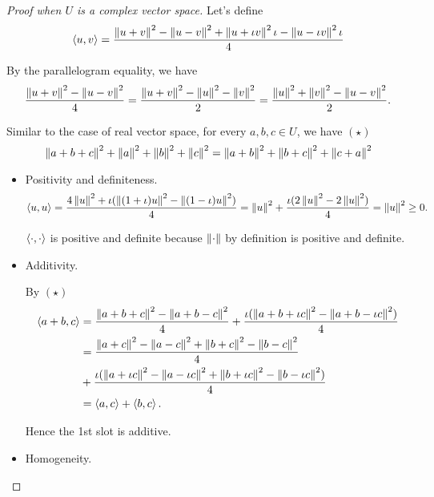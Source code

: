 \begin{proof}[Proof when $U$ is a complex vector space]
    Let's define
    \[
        \left\langle{u, v}\right\rangle = \frac{\left\Vert{u + v}\right\Vert^{2} - \left\Vert{u - v}\right\Vert^{2} + \left\Vert{u + \iota v}\right\Vert^{2}\iota - \left\Vert{u - \iota v}\right\Vert^{2}\iota}{4}
    \]

    By the parallelogram equality, we have
    \[
        \frac{\left\Vert{u + v}\right\Vert^{2} - \left\Vert{u - v}\right\Vert^{2}}{4} = \frac{\left\Vert{u + v}\right\Vert^{2} - \left\Vert{u}\right\Vert^{2} - \left\Vert{v}\right\Vert^{2}}{2} = \frac{\left\Vert{u}\right\Vert^{2} + \left\Vert{v}\right\Vert^{2} - \left\Vert{u - v}\right\Vert^{2}}{2}.
    \]

    Similar to the case of real vector space, for every $a, b, c\in U$, we have $(\star)$
    \[
        \left\Vert{a + b + c}\right\Vert^{2} + \left\Vert{a}\right\Vert^{2} + \left\Vert{b}\right\Vert^{2} + \left\Vert{c}\right\Vert^{2} = \left\Vert{a + b}\right\Vert^{2} + \left\Vert{b + c}\right\Vert^{2} + \left\Vert{c + a}\right\Vert^{2}
    \]

    \begin{itemize}
        \item Positivity and definiteness.
              \[
                  \left\langle{u, u}\right\rangle = \frac{4\left\Vert{u}\right\Vert^{2} + \iota(\left\Vert{(1 + \iota)u}\right\Vert^{2} - \left\Vert{(1 - \iota)u}\right\Vert^{2})}{4} = \left\Vert{u}\right\Vert^{2} + \frac{\iota(2\left\Vert{u}\right\Vert^{2} - 2\left\Vert{u}\right\Vert^{2})}{4} = \left\Vert{u}\right\Vert^{2} \geq 0.
              \]

              $\left\langle{\cdot, \cdot}\right\rangle$ is positive and definite because $\left\Vert{\cdot}\right\Vert$ by definition is positive and definite.
        \item Additivity.

              By $(\star)$
              \begin{align*}
                  \left\langle{a + b, c}\right\rangle & = \frac{\left\Vert{a + b + c}\right\Vert^{2} - \left\Vert{a + b - c}\right\Vert^{2}}{4} + \frac{\iota(\left\Vert{a + b + \iota c}\right\Vert^{2} - \left\Vert{a + b - \iota c}\right\Vert^{2})}{4} \\
                                       & = \frac{\left\Vert{a + c}\right\Vert^{2} - \left\Vert{a - c}\right\Vert^{2} + \left\Vert{b + c}\right\Vert^{2} - \left\Vert{b - c}\right\Vert^{2}}{4}                                              \\
                                       & + \frac{\iota(\left\Vert{a + \iota c}\right\Vert^{2} - \left\Vert{a - \iota c}\right\Vert^{2} + \left\Vert{b + \iota c}\right\Vert^{2} - \left\Vert{b - \iota c}\right\Vert^{2})}{4}               \\
                                       & = \left\langle{a, c}\right\rangle + \left\langle{b, c}\right\rangle.
              \end{align*}

              Hence the 1st slot is additive.
        \item Homogeneity.


\end{itemize}
\end{proof}
